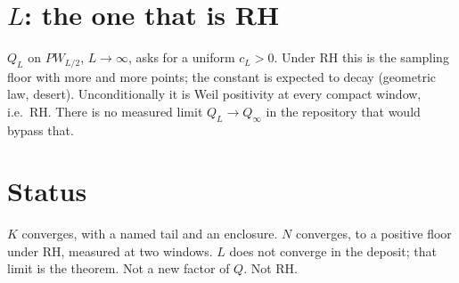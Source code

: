 \documentclass[11pt]{article}
\begin{document}
\section{$L$: the one that is RH}
$Q_L$ on $PW_{L/2}$, $L\to\infty$, asks for a uniform $c_L>0$.
Under RH this is the sampling floor with more and more points; the
constant is expected to decay (geometric law, desert).
Unconditionally it is Weil positivity at every compact window, i.e.\
RH. There is no measured limit $Q_L\to Q_\infty$ in the repository
that would bypass that.

\section*{Status}
$K$ converges, with a named tail and an enclosure. $N$ converges,
to a positive floor under RH, measured at two windows. $L$ does not
converge in the deposit; that limit is the theorem. Not a new factor
of $Q$. Not RH.
\end{document}
